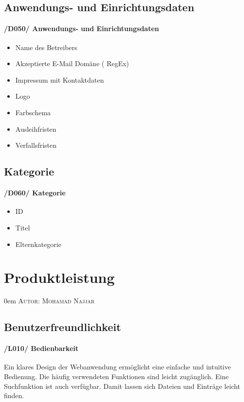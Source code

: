 \documentclass{article}
\makeatletter
\newcommand{\sectionauthor}[1]{
	{\parindent 0em \large \scshape Autor: #1 \par \nobreak \vspace*{2em}}
	\@afterheading
}
\makeatother
\begin{document}
	\subsection{Anwendungs- und Einrichtungsdaten}
	\label{D050} \paragraph{/D050/ Anwendungs- und Einrichtungsdaten}
	\begin{itemize}
		\item Name des Betreibers
		\item Akzeptierte E-Mail Domäne ( RegEx)
		\item Impressum mit Kontaktdaten
		\item Logo
		\item Farbschema
		\item Ausleihfristen
        \item Verfallsfristen
	\end{itemize}

\subsection{Kategorie}
	\label{D060} \paragraph{/D060/ Kategorie}
	\begin{itemize}

	\item ID
	\item Titel
	\item Elternkategorie

	\end{itemize}
	\section{Produktleistung} %
\sectionauthor{Mohamad Najjar}
\subsection{Benutzerfreundlichkeit}
 \paragraph{/L010/ \label{L010} Bedienbarkeit}
    Ein klares Design der Webanwendung ermöglicht eine einfache und intuitive Bedienung. Die häufig verwendeten Funktionen sind leicht zugänglich. Eine Suchfunktion ist auch  verfügbar. Damit lassen sich Dateien und Einträge leicht finden.
\end{document}
